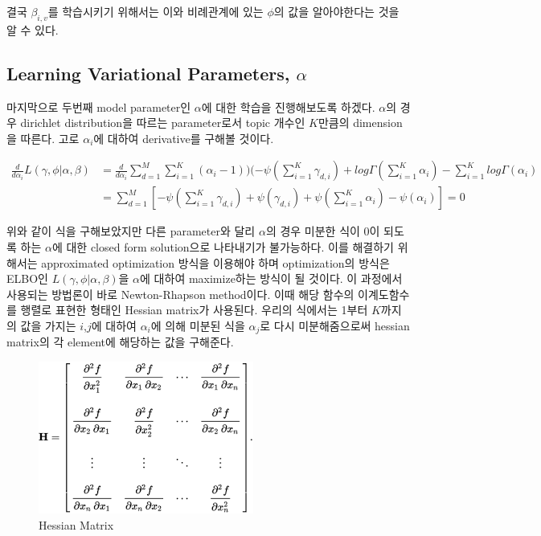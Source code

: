 \documentclass[draft=false]{oblivoir}
\begin{document}
결국 $\beta_{i,v}$를 학습시키기 위해서는 이와 비례관계에 있는 $\phi$의 값을 알아야한다는 것을 알 수 있다.

\subsection{Learning Variational Parameters, \texorpdfstring{$\alpha$}{Lg}}
마지막으로 두번째 model parameter인 $\alpha$에 대한 학습을 진행해보도록 하겠다. $\alpha$의 경우 dirichlet distribution을 따르는 parameter로서 topic 개수인 $K$만큼의 dimension을 따른다. 고로 $\alpha_{i}$에 대하여 derivative를 구해볼 것이다.

\begin{align}
\frac{d}{d\alpha_{i}}L(\gamma,\phi|\alpha,\beta)\nonumber & =
\frac{d}{d\alpha_{i}}\sum^{M}_{d=1}\sum^{K}_{i=1}(\alpha_{i}-1))(-\psi(\sum^{K}_{i=1}\gamma_{d,i})+log\Gamma(\sum^{K}_{i=1}\alpha_{i})-\sum^{K}_{i=1}log\Gamma(\alpha_{i})\nonumber\\
& = \sum^{M}_{d=1}[-\psi(\sum^{K}_{i=1}\gamma_{d,i})+\psi(\gamma_{d,i})+\psi(\sum^{K}_{i=1}\alpha_{i})-\psi(\alpha_{i})] = 0 
\end{align}

위와 같이 식을 구해보았지만 다른 parameter와 달리 $\alpha$의 경우 미분한 식이 0이 되도록 하는 $\alpha$에 대한 closed form solution으로 나타내기가 불가능하다. 이를 해결하기 위해서는 approximated optimization 방식을 이용해야 하며 optimization의 방식은 ELBO인 $L(\gamma,\phi|\alpha,\beta)$을 $\alpha$에 대하여 maximize하는 방식이 될 것이다. 이 과정에서 사용되는 방법론이 바로 Newton-Rhapson method이다. 이때 해당 함수의 이계도함수를 행렬로 표현한 형태인 Hessian matrix가 사용된다. 우리의 식에서는 1부터 $K$까지의 값을 가지는 $i$,$j$에 대하여 $\alpha_{i}$에 의해 미분된 식을 $\alpha_{j}$로 다시 미분해줌으로써 hessian matrix의 각 element에 해당하는 값을 구해준다. 

\begin{figure}[ht] \centering 
\includegraphics[scale=0.6]{fig11_14.png} 
\caption{Hessian Matrix}
\label{fig:11-13}
\end{figure}
\end{document}

